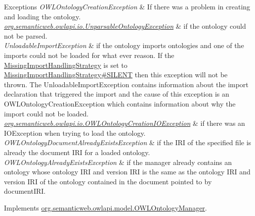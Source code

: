 \begin{DoxyExceptions}{Exceptions}
{\em O\-W\-L\-Ontology\-Creation\-Exception} & If there was a problem in creating and loading the ontology. \\
\hline
{\em \hyperlink{classorg_1_1semanticweb_1_1owlapi_1_1io_1_1_unparsable_ontology_exception}{org.\-semanticweb.\-owlapi.\-io.\-Unparsable\-Ontology\-Exception}} & if the ontology could not be parsed. \\
\hline
{\em Unloadable\-Import\-Exception} & if the ontology imports ontologies and one of the imports could not be loaded for what ever reason. If the \hyperlink{}{Missing\-Import\-Handling\-Strategy} is set to \hyperlink{enumorg_1_1semanticweb_1_1owlapi_1_1model_1_1_missing_import_handling_strategy_aed66060ec95dc4ad59ca4dd82509782b}{Missing\-Import\-Handling\-Strategy\#\-S\-I\-L\-E\-N\-T} then this exception will not be thrown. The {\ttfamily Unloadable\-Import\-Exception} contains information about the import declaration that triggered the import and the cause of this exception is an {\ttfamily O\-W\-L\-Ontology\-Creation\-Exception} which contains information about why the import could not be loaded. \\
\hline
{\em \hyperlink{classorg_1_1semanticweb_1_1owlapi_1_1io_1_1_o_w_l_ontology_creation_i_o_exception}{org.\-semanticweb.\-owlapi.\-io.\-O\-W\-L\-Ontology\-Creation\-I\-O\-Exception}} & if there was an {\ttfamily I\-O\-Exception} when trying to load the ontology. \\
\hline
{\em O\-W\-L\-Ontology\-Document\-Already\-Exists\-Exception} & if the I\-R\-I of the specified file is already the document I\-R\-I for a loaded ontology. \\
\hline
{\em O\-W\-L\-Ontology\-Already\-Exists\-Exception} & if the manager already contains an ontology whose ontology I\-R\-I and version I\-R\-I is the same as the ontology I\-R\-I and version I\-R\-I of the ontology contained in the document pointed to by {\ttfamily document\-I\-R\-I}. \\
\hline
\end{DoxyExceptions}


Implements \hyperlink{interfaceorg_1_1semanticweb_1_1owlapi_1_1model_1_1_o_w_l_ontology_manager_a2ee9612211d19965085db486a65b0854}{org.\-semanticweb.\-owlapi.\-model.\-O\-W\-L\-Ontology\-Manager}.

